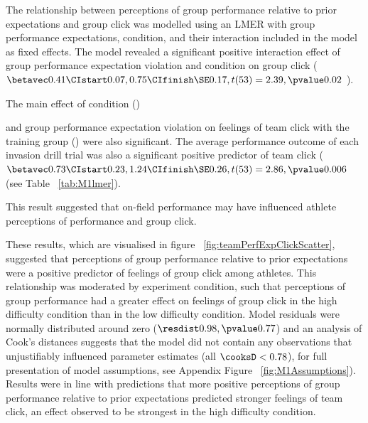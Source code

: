 The relationship between perceptions of group performance relative to prior expectations and group click was modelled using an LMER with group performance expectations, condition, and their interaction included in the model as fixed effects. The model revealed a significant positive interaction effect of group performance expectation violation and condition on group click
($\betavec 0.41 \CIstart 0.07, 0.75 \CIfinish \SE 0.17, t(53) = 2.39, \pvalue 0.02 $ \MR \CR).

The main effect of condition ()

 and group performance expectation violation on feelings of team click with the training group
 () were also significant.  The average performance outcome of each invasion drill trial was also a significant positive predictor of team click ($\betavec 0.73 \CIstart 0.23, 1.24 \CIfinish \SE 0.26, t(53)= 2.86, \pvalue 0.006$ (see Table ~\ref{tab:M1lmer}).

 This result suggested that on-field performance may have influenced athlete perceptions of performance and group click.

These results, which are visualised in figure ~\ref{fig:teamPerfExpClickScatter}, suggested that perceptions of group performance relative to prior expectations were a positive predictor of feelings of group click among athletes.  This relationship was moderated by experiment condition, such that perceptions of group performance had a greater effect on feelings of group click in the high difficulty condition than in the low difficulty condition.  Model residuals were normally distributed around zero ($\resdist 0.98, \pvalue 0.77 $) and an analysis of Cook's distances suggests that the model did not contain any observations that unjustifiably influenced parameter estimates (all $\cooksD < 0.78$), for full presentation of model assumptions, see Appendix Figure ~\ref{fig:M1Assumptions}).  Results were in line with predictions that more positive perceptions of group performance relative to prior expectations predicted stronger feelings of team click, an effect observed to be strongest in the high difficulty condition.




